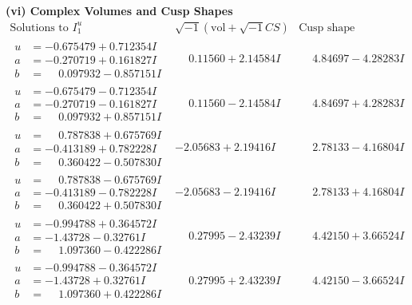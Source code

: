 \documentclass[1p]{elsarticle_modified}
\theoremstyle{definition}
\newcommand{\I}{\sqrt{-1}}
\begin{document}
\newpage\flushleft \textbf{(vi) Complex Volumes and Cusp Shapes}
$$\begin{array}{c|c|c}  
\text{Solutions to }I^u_{1}& \I (\text{vol} + \sqrt{-1}CS) & \text{Cusp shape}\\
 \hline 
\begin{aligned}
u &= -0.675479 + 0.712354 I \\
a &= -0.270719 + 0.161827 I \\
b &= \phantom{-}0.097932 - 0.857151 I\end{aligned}
 & \phantom{-}0.11560 + 2.14584 I & \phantom{-}4.84697 - 4.28283 I \\ \hline\begin{aligned}
u &= -0.675479 - 0.712354 I \\
a &= -0.270719 - 0.161827 I \\
b &= \phantom{-}0.097932 + 0.857151 I\end{aligned}
 & \phantom{-}0.11560 - 2.14584 I & \phantom{-}4.84697 + 4.28283 I \\ \hline\begin{aligned}
u &= \phantom{-}0.787838 + 0.675769 I \\
a &= -0.413189 + 0.782228 I \\
b &= \phantom{-}0.360422 - 0.507830 I\end{aligned}
 & -2.05683 + 2.19416 I & \phantom{-}2.78133 - 4.16804 I \\ \hline\begin{aligned}
u &= \phantom{-}0.787838 - 0.675769 I \\
a &= -0.413189 - 0.782228 I \\
b &= \phantom{-}0.360422 + 0.507830 I\end{aligned}
 & -2.05683 - 2.19416 I & \phantom{-}2.78133 + 4.16804 I \\ \hline\begin{aligned}
u &= -0.994788 + 0.364572 I \\
a &= -1.43728 - 0.32761 I \\
b &= \phantom{-}1.097360 - 0.422286 I\end{aligned}
 & \phantom{-}0.27995 - 2.43239 I & \phantom{-}4.42150 + 3.66524 I \\ \hline\begin{aligned}
u &= -0.994788 - 0.364572 I \\
a &= -1.43728 + 0.32761 I \\
b &= \phantom{-}1.097360 + 0.422286 I\end{aligned}
 & \phantom{-}0.27995 + 2.43239 I & \phantom{-}4.42150 - 3.66524 I \\ \hline\begin{aligned}

\end{aligned}
\end{array}$$
\end{document}

